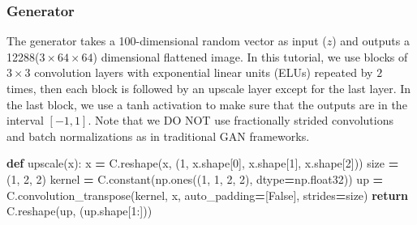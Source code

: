 \documentclass[]{book}
\newenvironment{Shaded}{\begin{snugshade}}{\end{snugshade}}
\newcommand{\KeywordTok}[1]{\textcolor[rgb]{0.13,0.29,0.53}{\textbf{#1}}}
\newcommand{\DecValTok}[1]{\textcolor[rgb]{0.00,0.00,0.81}{#1}}
\newcommand{\VariableTok}[1]{\textcolor[rgb]{0.00,0.00,0.00}{#1}}
\newcommand{\ControlFlowTok}[1]{\textcolor[rgb]{0.13,0.29,0.53}{\textbf{#1}}}
\newcommand{\OperatorTok}[1]{\textcolor[rgb]{0.81,0.36,0.00}{\textbf{#1}}}
\newcommand{\NormalTok}[1]{#1}
\theoremstyle{definition}
\theoremstyle{definition}
\theoremstyle{definition}
\theoremstyle{remark}
\begin{document}
\subsubsection{Generator}\label{generator-1}

The generator takes a 100-dimensional random vector as input (\(z\)) and
outputs a 12288(\(3\times64\times64\)) dimensional flattened image. In
this tutorial, we use blocks of \(3\times3\) convolution layers with
exponential linear units (ELUs) repeated by \(2\) times, then each block
is followed by an upscale layer except for the last layer. In the last
block, we use a tanh activation to make sure that the outputs are in the
interval \([-1,1]\). Note that we DO NOT use fractionally strided
convolutions and batch normalizations as in traditional GAN frameworks.

\begin{Shaded}
\begin{Highlighting}[]
\KeywordTok{def}\NormalTok{ upscale(x):}
\NormalTok{    x }\OperatorTok{=}\NormalTok{ C.reshape(x, (}\DecValTok{1}\NormalTok{, x.shape[}\DecValTok{0}\NormalTok{], x.shape[}\DecValTok{1}\NormalTok{], x.shape[}\DecValTok{2}\NormalTok{]))}
\NormalTok{    size }\OperatorTok{=}\NormalTok{ (}\DecValTok{1}\NormalTok{, }\DecValTok{2}\NormalTok{, }\DecValTok{2}\NormalTok{)}
\NormalTok{    kernel }\OperatorTok{=}\NormalTok{ C.constant(np.ones((}\DecValTok{1}\NormalTok{, }\DecValTok{1}\NormalTok{, }\DecValTok{2}\NormalTok{, }\DecValTok{2}\NormalTok{), dtype}\OperatorTok{=}\NormalTok{np.float32))}
\NormalTok{    up }\OperatorTok{=}\NormalTok{ C.convolution_transpose(kernel, x, auto_padding}\OperatorTok{=}\NormalTok{[}\VariableTok{False}\NormalTok{], strides}\OperatorTok{=}\NormalTok{size)}
    \ControlFlowTok{return}\NormalTok{ C.reshape(up, (up.shape[}\DecValTok{1}\NormalTok{:]))}
\end{Highlighting}
\end{Shaded}
\end{document}
